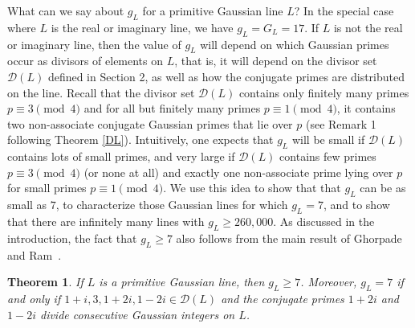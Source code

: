 \documentclass[11pt]{article}
\newtheorem{theorem}{Theorem}
\newcommand{\DL}{{\mathcal{D}}(L)}
\begin{document}
What can we say about $g_L$ for a primitive Gaussian line $L$? In the special case where $L$ is the real or imaginary line, we have 
$g_L=G_L=17$. If $L$ is not the real or imaginary line,  then the  value of $g_L$ will depend on which Gaussian primes occur as divisors of elements on $L$, that is, it will depend on the divisor set $\DL$ defined in Section 2, as well as how the conjugate primes are distributed on the line.
Recall that the divisor set $\DL$ contains only finitely many primes $p\equiv 3\pmod 4$ and for all but finitely many primes $p\equiv 1\pmod 4$, it contains two non-associate conjugate Gaussian primes that lie over $p$ (see Remark 1 following Theorem \ref{DL}).  Intuitively, one expects that $g_L$ will be small if $\DL$ contains lots of small primes, and very large if $\DL$ contains few primes $p\equiv 3\pmod 4$ (or none at all) and exactly one non-associate prime lying over $p$ for small  primes $p\equiv 1\pmod 4$.
We use this idea to show that  that $g_L$ can be as small as $7$, to characterize those Gaussian lines for which $g_L=7$, and to
show that there are infinitely many lines with $g_L\geq 260{,}000$.  As discussed in the introduction, the fact that $g_L\geq 7$ also follows from the main result of Ghorpade and Ram~\cite{ghorpade}.


 \begin{theorem}\label{gLmin}
If $L$ is a primitive Gaussian line, then $g_L\geq 7$.  Moreover, $g_L=7$ if and only if $1+i, 3, 1+2i,1-2i\in\DL$ and the conjugate primes $1+2i$ and $1-2i$ divide consecutive Gaussian integers on $L$.  
\end{theorem}
\end{document}
